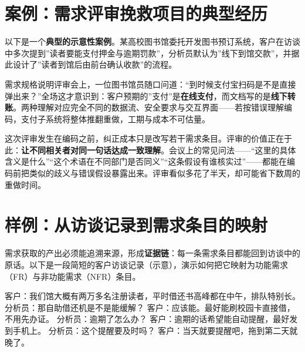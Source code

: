 \documentclass[
]{ctexbook}
\newenvironment{Shaded}{
  \ttfamily\small
}{}
\newcommand{\NormalTok}[1]{#1}
\begin{document}
\section{案例：需求评审挽救项目的典型经历}\label{ux6848ux4f8bux9700ux6c42ux8bc4ux5ba1ux633dux6551ux9879ux76eeux7684ux5178ux578bux7ecfux5386}

以下是一个\textbf{典型的示意性案例}。某高校图书馆委托开发图书预订系统，客户在访谈中多次提到''读者要能支付押金与逾期罚款''，分析员默认为''线下到馆交款''，并据此设计了''读者到馆后由前台确认收款''的流程。

需求规格说明评审会上，一位图书馆员随口问道：``到时候支付宝扫码是不是直接弹出来？''全场这才意识到：客户预期的''支付''是\textbf{在线支付}，而文档写的是\textbf{线下转账}。两种理解对应完全不同的数据流、安全要求与交互界面------若按错误理解编码，支付子系统将整体推翻重做，工期与成本不可估量。

这次评审发生在编码之前，纠正成本只是改写若干需求条目。评审的价值正在于此：\textbf{让不同相关者对同一句话达成一致理解}。会议上的常见问法------``这里的具体含义是什么''``这个术语在不同部门是否同义''``这条假设有谁核实过''------都能在编码前把类似的歧义与错误假设暴露出来。评审看似多花了半天，却可能省下数周的重做时间。

\section{样例：从访谈记录到需求条目的映射}\label{ux6837ux4f8bux4eceux8bbfux8c08ux8bb0ux5f55ux5230ux9700ux6c42ux6761ux76eeux7684ux6620ux5c04}

需求获取的产出必须能追溯来源，形成\textbf{证据链}：每一条需求条目都能回到访谈中的原话。以下是一段简短的客户访谈记录（示意），演示如何把它映射为功能需求（FR）与非功能需求（NFR）条目。

\begin{Shaded}
\begin{Highlighting}[]
\NormalTok{客户：我们馆大概有两万多名注册读者，平时借还书高峰都在中午，排队特别长。}
\NormalTok{分析员：那自助借还机是不是能缓解？}
\NormalTok{客户：应该能。最好能刷校园卡直接借，不用先办证。}
\NormalTok{分析员：逾期了怎么办？}
\NormalTok{客户：逾期的话希望能自动提醒，最好发到手机上。}
\NormalTok{分析员：这个提醒要及时吗？}
\NormalTok{客户：当天就要提醒吧，拖到第二天就晚了。}
\end{Highlighting}
\end{Shaded}
\end{document}
